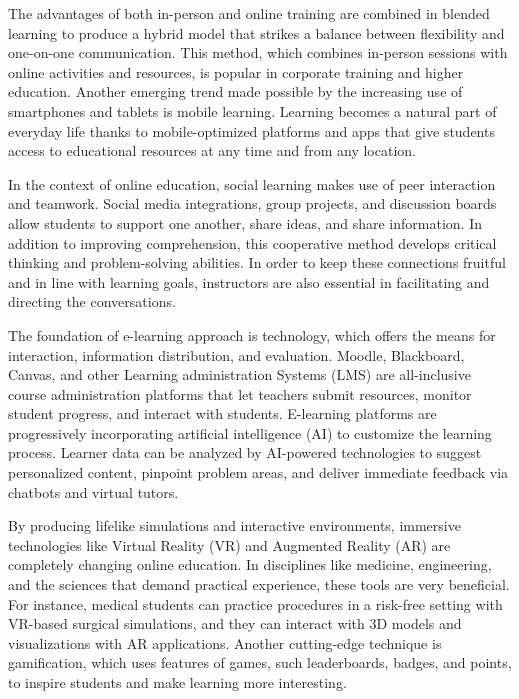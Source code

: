 \documentclass[BTech]{audiss}
\begin{document}
The advantages of both in-person and online training are combined in blended learning to produce a hybrid model that strikes a balance between flexibility and one-on-one communication. This method, which combines in-person sessions with online activities and resources, is popular in corporate training and higher education. Another emerging trend made possible by the increasing use of smartphones and tablets is mobile learning. Learning becomes a natural part of everyday life thanks to mobile-optimized platforms and apps that give students access to educational resources at any time and from any location.

In the context of online education, social learning makes use of peer interaction and teamwork. Social media integrations, group projects, and discussion boards allow students to support one another, share ideas, and share information. In addition to improving comprehension, this cooperative method develops critical thinking and problem-solving abilities. In order to keep these connections fruitful and in line with learning goals, instructors are also essential in facilitating and directing the conversations.

The foundation of e-learning approach is technology, which offers the means for interaction, information distribution, and evaluation. Moodle, Blackboard, Canvas, and other Learning administration Systems (LMS) are all-inclusive course administration platforms that let teachers submit resources, monitor student progress, and interact with students. E-learning platforms are progressively incorporating artificial intelligence (AI) to customize the learning process. Learner data can be analyzed by AI-powered technologies to suggest personalized content, pinpoint problem areas, and deliver immediate feedback via chatbots and virtual tutors.

By producing lifelike simulations and interactive environments, immersive technologies like Virtual Reality (VR) and Augmented Reality (AR) are completely changing online education. In disciplines like medicine, engineering, and the sciences that demand practical experience, these tools are very beneficial. For instance, medical students can practice procedures in a risk-free setting with VR-based surgical simulations, and they can interact with 3D models and visualizations with AR applications. Another cutting-edge technique is gamification, which uses features of games, such leaderboards, badges, and points, to inspire students and make learning more interesting.
\end{document}
